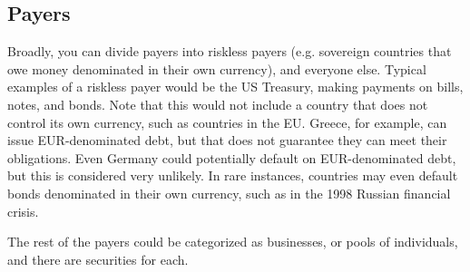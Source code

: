 \documentclass{report}
\numberwithin{problem}{chapter} %
\begin{document}
\subsection{Payers}
Broadly, you can divide payers into riskless payers (e.g. sovereign countries that owe money denominated in their own currency), and everyone else. Typical examples of a riskless payer would be the US Treasury, making payments on bills, notes, and bonds.  Note that this would not include a country that does not control its own currency, such as countries in the EU. Greece, for example, can issue EUR-denominated debt, but that does not guarantee they can meet their obligations. Even Germany could potentially default on EUR-denominated debt, but this is considered very unlikely. In rare instances, countries may even default bonds denominated in their own currency, such as in the 1998 Russian financial crisis. 

The rest of the payers could be categorized as businesses, or pools of individuals, and there are securities for each. 



\printbibliography
\end{document}
